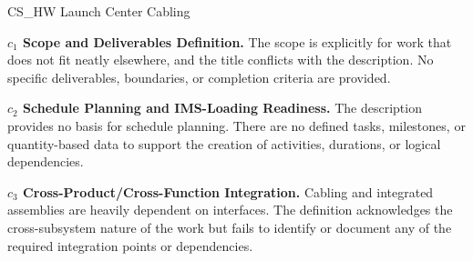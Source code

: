 %
\begin{frame}{CS\_HW Launch Center Cabling}
\begin{minipage}{0.90\textwidth}
\raggedright
\fontsize{8}{9.5}\selectfont
\textbf{\(c_1\) Scope and Deliverables Definition.}
The scope is explicitly for work that does not fit neatly elsewhere, and the title conflicts with the description. No specific deliverables, boundaries, or completion criteria are provided.\par\vspace{0.6em}
\textbf{\(c_2\) Schedule Planning and IMS-Loading Readiness.}
The description provides no basis for schedule planning. There are no defined tasks, milestones, or quantity-based data to support the creation of activities, durations, or logical dependencies.\par\vspace{0.6em}
\textbf{\(c_3\) Cross-Product/Cross-Function Integration.}
Cabling and integrated assemblies are heavily dependent on interfaces. The definition acknowledges the cross-subsystem nature of the work but fails to identify or document any of the required integration points or dependencies.\par\vspace{0.6em}
\end{minipage}
\end{frame}

\endinput
